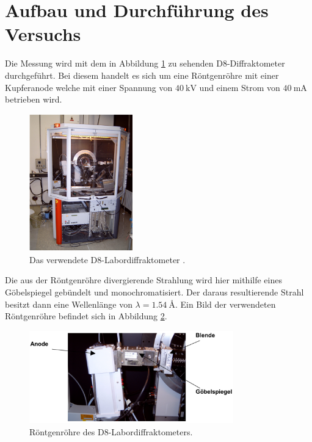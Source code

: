 \section{Aufbau und Durchführung des Versuchs}
\label{sec:Durchführung}
Die Messung wird mit dem in Abbildung \ref{fig:app} zu sehenden D8-Diffraktometer durchgeführt. 
Bei diesem handelt es sich um eine Röntgenröhre mit einer Kupferanode welche mit einer Spannung von $\SI{40}{\kilo\volt}$
und einem Strom von $\SI{40}{\milli\ampere}$ betrieben wird. \\
\begin{figure}[H]
  \centering
  \includegraphics[width=0.4\textwidth]{content/images/apparatur.PNG}
  \caption{Das verwendete D8-Labordiffraktometer \cite{anleitung}. }
  \label{fig:app}
\end{figure}
Die aus der Röntgenröhre divergierende Strahlung wird hier mithilfe eines Göbelspiegel
gebündelt und monochromatisiert. Der daraus resultierende Strahl besitzt dann eine Wellenlänge von
$\lambda=\SI{1.54}{\angstrom}$. Ein Bild der verwendeten Röntgenröhre befindet sich in Abbildung \ref{fig:anode}.

\begin{figure}[H]
  \centering
  \includegraphics[height=4cm]{content/images/anode.PNG}
  \caption{Röntgenröhre des D8-Labordiffraktometers\cite{anleitung}.}
  \label{fig:anode}
\end{figure}



